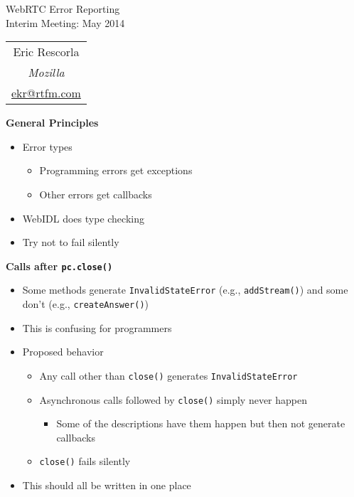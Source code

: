 \documentclass[helvetica]{seminar}
\newcommand{\heading}[1]{%
  \begin{center} 
    \large\bf 
    #1 
  \end{center} 
  \vspace{.4 in}}
\begin{document}
\begin{slide}
\begin{center}
\vspace{1 in}
\LARGE{{\bf}WebRTC Error Reporting}\\
\vspace{.2in}
\large{{Interim Meeting: May 2014}} \\
\vspace{3em}
\large{
\begin{tabular}{c}
Eric Rescorla \\
\emph{Mozilla} \\
\url{ekr@rtfm.com}
\end{tabular}
}
\end{center}

\end{slide}


\centerslidesfalse

\begin{slide}
\heading{General Principles}

\begin{itemize}
\item Error types
  \begin{itemize}
  \item Programming errors get exceptions
  \item Other errors get callbacks
  \end{itemize}

\item WebIDL does type checking
\item Try not to fail silently
\end{itemize}
\end{slide}


\begin{slide}
\heading{Calls after \texttt{pc.close()}}

\begin{itemize}
\item Some methods generate \verb^InvalidStateError^ (e.g., \verb^addStream()^) and some don't (e.g., \verb^createAnswer()^)
\item This is confusing for programmers
\item Proposed behavior
  \begin{itemize}
  \item Any call other than \verb^close()^ generates \verb^InvalidStateError^
  \item Asynchronous calls followed by \verb^close()^ simply never happen
    \begin{itemize}
    \item Some of the descriptions have them happen but then not generate callbacks
    \end{itemize}
  \item \verb^close()^ fails silently
  \end{itemize}

\item This should all be written in one place  
\end{itemize}
\end{slide}
\end{document}
